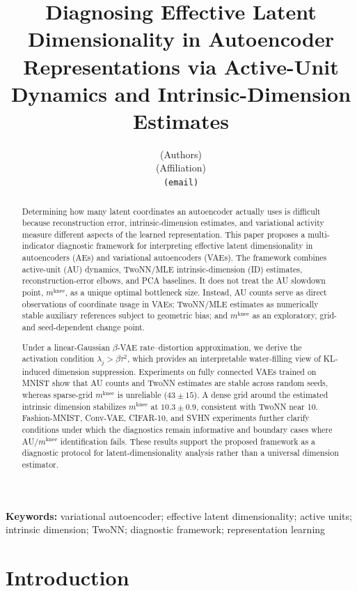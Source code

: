 \documentclass[11pt,a4paper]{article}
\title{\textbf{Diagnosing Effective Latent Dimensionality in Autoencoder
Representations via Active-Unit Dynamics and Intrinsic-Dimension Estimates}}
\author{(Authors)\\
{\small (Affiliation)}\\
{\small \texttt{(email)}}}
\date{}
\newcommand{\mknee}{m^{\mathrm{knee}}}
\begin{document}
\maketitle

\begin{abstract}
Determining how many latent coordinates an autoencoder actually uses is
difficult because reconstruction error, intrinsic-dimension estimates, and
variational activity measure different aspects of the learned representation.
This paper proposes a multi-indicator diagnostic framework for interpreting
effective latent dimensionality in autoencoders (AEs) and variational
autoencoders (VAEs). The framework combines active-unit (AU) dynamics,
TwoNN/MLE intrinsic-dimension (ID) estimates, reconstruction-error elbows, and
PCA baselines. It does not treat the AU slowdown point, $\mknee$, as a unique
optimal bottleneck size. Instead, AU counts serve as direct observations of
coordinate usage in VAEs; TwoNN/MLE estimates as numerically stable auxiliary
references subject to geometric bias; and $\mknee$ as an exploratory,
grid- and seed-dependent change point.

Under a linear-Gaussian $\beta$-VAE rate--distortion approximation, we derive
the activation condition $\lambda_j > \beta\tau^2$, which provides an
interpretable water-filling view of KL-induced dimension suppression.
Experiments on fully connected VAEs trained on MNIST show that AU counts and
TwoNN estimates are stable across random seeds, whereas sparse-grid $\mknee$
is unreliable ($43\pm15$). A dense grid around the estimated intrinsic
dimension stabilizes $\mknee$ at $10.3\pm0.9$, consistent with TwoNN near 10.
Fashion-MNIST, Conv-VAE, CIFAR-10, and SVHN experiments further clarify
conditions under which the diagnostics remain informative and boundary cases
where AU/$\mknee$ identification fails. These results support the proposed
framework as a diagnostic protocol for latent-dimensionality analysis rather
than a universal dimension estimator.
\end{abstract}

\noindent\textbf{Keywords:} variational autoencoder; effective latent
dimensionality; active units; intrinsic dimension; TwoNN; diagnostic framework;
representation learning

\section{Introduction}\label{sec:intro}
\end{document}
